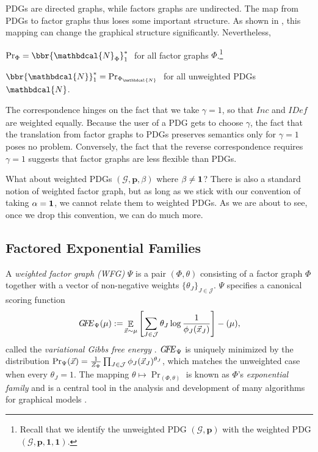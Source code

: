 \documentclass[letterpaper]{article} %
\theoremstyle{plain}
\theoremstyle{definition}
\theoremstyle{remark}
\newcommand{\begthm}[3][]{\begin{#2}[{name=#1},restate=#3,label=#3]}
\let\H\relax
\DeclareMathOperator{\H}{\mathrm{H}} %
\DeclareMathOperator*{\Ex}{\mathbb{E}} %
\newcommand\mat[1]{\mathbf{#1}}
\newcommand{\dg}[1]{\mathbdcal{#1}}
\newcommand{\IDef}[1]{\mathit{IDef}_{\!#1}}
\newcommand\Inc{\mathit{Inc}}
\newcommand{\UPDGof}[1]{{\dg N}_{#1}}
\newcommand{\FGof}[1]{\Phi_{{#1}}}
\newcommand{\Gr}{\mathcal G}
\newcommand\GFE{\mathit{G\mkern-4mu F\mkern-4.5mu E}}
\begin{document}
PDGs are directed graphs, while factors graphs are undirected. The
map from PDGs to factor graphs thus loses some important structure.
As shown in ,
this mapping can change the graphical structure significantly.
Nevertheless,




\begthm{theorem}{thm:fg-is-pdg}
$\Pr_{\Phi} = \bbr{\UPDGof{\Phi}}_{1}^*\;$ for all factor graphs
$\Phi$.\footnote{Recall that we identify the unweighted PDG $(\Gr,\mat
p)$ with the weighted PDG $(\Gr,\mat p,  \mat 1, \mat 1)$.}  
\end{theorem}
\begthm{theorem}{thm:pdg-is-fg}
$\bbr{\dg N}_{1}^* = \Pr_{\FGof{\dg N}}\;$ for all unweighted
	PDGs $\dg N$.  
\end{theorem}
The correspondence hinges on the fact that we take $\gamma=1$, so that $\Inc$ and
$\IDef{}$ are weighted equally.
Because the user of a PDG gets to choose $\gamma$, the fact that the 
translation from factor graphs to PDGs preserves semantics only for $\gamma=1$
poses no problem.
Conversely, the fact that the reverse correspondence requires
$\gamma=1$ suggests 
that factor graphs are less flexible than PDGs.

What about weighted PDGs $(\Gr, \mat p, \beta)$ where $\beta \ne {\bf 1}$?
There is also a standard notion of weighted factor graph,
but as long as we stick with our convention of taking  $\alpha = {\bf 1}$, 
we cannot relate them to weighted PDGs.  
As we are about to see,
once we drop this convention, we can do much more.


\subsection{Factored Exponential Families}\label{sec:expfam}

A \emph{weighted factor graph (WFG)} $\Psi$ is a pair
$(\Phi,\theta)$ consisting of a factor graph $\Phi$ 
together with a vector of non-negative weights
$\{ \theta_J \}_{J \in \mathcal J}$.
$\Psi$ specifies a canonical scoring function 
\begin{equation}
\GFE_{\Psi}(\mu)
	 := \!\Ex_{\vec x\sim\mu}\left[  \sum_{J \in
           \cal J} \theta_J \log\frac1{\phi_J(\vec
               x_J)}\right] - \H(\mu)  , 
			   \label{eqn:free-energy}
\end{equation}
called the \emph{variational
Gibbs free energy} \cite{mezard2009information}. 
$\GFE_{\Psi}$ is uniquely minimized by the distribution
${\Pr}_{\Psi}(\vec x) = \frac{1}{Z_{\Psi}}
 	\prod_{J \in \cal J} \phi_J(\vec x_J)^{\theta_J}$, 
which matches the unweighted case when every $\theta_J = 1$.
The mapping $\theta \mapsto \Pr_{(\Phi,\theta)}$ is known as 
$\Phi$'s \emph{exponential family} and is a central tool in the analysis  
and development of many algorithms for graphical models \cite{wainwright2008graphical}.
\end{document}
